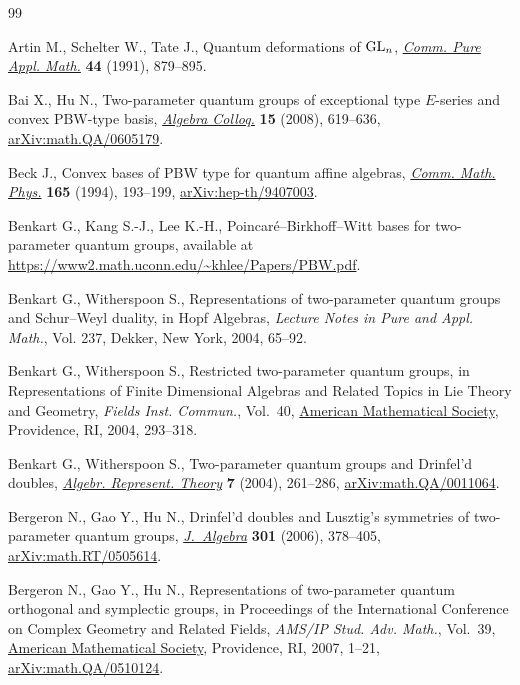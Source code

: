 \begin{thebibliography}{99}
\footnotesize\itemsep=0pt

Artin M., Schelter W., Tate J., Quantum deformations of {${\rm GL}_n$},
 \href{https://doi.org/10.1002/cpa.3160440804}{\textit{Comm. Pure Appl.
 Math.}} \textbf{44} (1991), 879--895.

Bai X., Hu N., Two-parameter quantum groups of exceptional type {$E$}-series
 and convex {PBW}-type basis,
 \href{https://doi.org/10.1142/S100538670800059X}{\textit{Algebra Colloq.}}
 \textbf{15} (2008), 619--636,
 \href{http://arxiv.org/abs/math.QA/0605179}{arXiv:math.QA/0605179}.

Beck J., Convex bases of {PBW} type for quantum affine algebras,
 \href{https://doi.org/10.1007/BF02099742}{\textit{Comm. Math. Phys.}}
 \textbf{165} (1994), 193--199,
 \href{http://arxiv.org/abs/hep-th/9407003}{arXiv:hep-th/9407003}.

Benkart G., Kang S.-J., Lee K.-H., Poincar\'e--{B}irkhoff--{W}itt bases for
 two-parameter quantum groups, {a}vailable at
 \url{https://www2.math.uconn.edu/~khlee/Papers/PBW.pdf}.

Benkart G., Witherspoon S., Representations of two-parameter quantum groups and
 {S}chur--{W}eyl duality, in Hopf Algebras, \textit{Lecture Notes in Pure and
 Appl. Math.}, Vol. 237, Dekker, New York, 2004, 65--92.

Benkart G., Witherspoon S., Restricted two-parameter quantum groups, in
 Representations of Finite Dimensional Algebras and Related Topics in {L}ie
 Theory and Geometry, \textit{Fields Inst. Commun.}, Vol.~40,
 \href{https://doi.org/10.1090/fic/040/15}{American Mathematical Society},
 Providence, RI, 2004, 293--318.

Benkart G., Witherspoon S., Two-parameter quantum groups and {D}rinfel'd
 doubles,
 \href{https://doi.org/10.1023/B:ALGE.0000031151.86090.2e}{\textit{Algebr.
 Represent. Theory}} \textbf{7} (2004), 261--286,
 \href{http://arxiv.org/abs/math.QA/0011064}{arXiv:math.QA/0011064}.

Bergeron N., Gao Y., Hu N., Drinfel'd doubles and {L}usztig's symmetries of
 two-parameter quantum groups,
 \href{https://doi.org/10.1016/j.jalgebra.2005.08.030}{\textit{J.~Algebra}}
 \textbf{301} (2006), 378--405,
 \href{http://arxiv.org/abs/math.RT/0505614}{arXiv:math.RT/0505614}.

Bergeron N., Gao Y., Hu N., Representations of two-parameter quantum orthogonal
 and symplectic groups, in Proceedings of the {I}nternational {C}onference on
 {C}omplex {G}eometry and {R}elated {F}ields, \textit{AMS/IP Stud. Adv.
 Math.}, Vol.~39, \href{https://doi.org/10.1090/amsip/039/01}{American
 Mathematical Society}, Providence, RI, 2007, 1--21,
 \href{http://arxiv.org/abs/math.QA/0510124}{arXiv:math.QA/0510124}.


\end{thebibliography}
